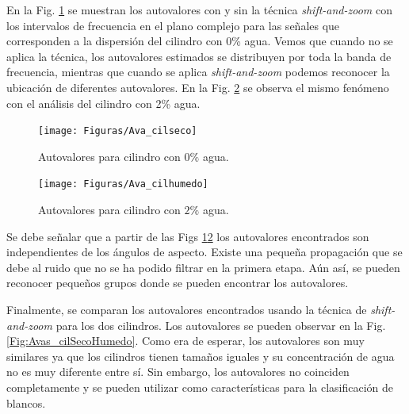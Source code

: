 	En la Fig. \ref{Fig:Avas_cilSeco} se muestran los autovalores con y sin la técnica  \emph{shift-and-zoom} con los intervalos de frecuencia en el plano complejo para las señales que corresponden a la dispersión del cilindro con 0\% agua. Vemos que cuando no se aplica la técnica, los autovalores estimados se distribuyen por toda la banda de frecuencia, mientras que cuando se aplica \emph{shift-and-zoom} podemos reconocer la ubicación de diferentes autovalores. En la Fig. \ref{Fig:Avas_cilHumedo} se observa  el mismo fenómeno con el análisis del cilindro con 2\% agua.
	
	\begin{figure}[ht]
		\centering
		\centerline{\texttt{[image: Figuras/Ava\_cilseco]}}
		\caption{Autovalores para cilindro con $0\%$ agua.}
		\label{Fig:Avas_cilSeco}
	\end{figure}
	
	\begin{figure}[ht]
		\centering
		\centerline{\texttt{[image: Figuras/Ava\_cilhumedo]}}
		\caption{Autovalores para cilindro con $2\%$ agua.}
		\label{Fig:Avas_cilHumedo}
	\end{figure}		
	
	
	Se debe señalar que  a partir de las Figs \ref{Fig:Avas_cilSeco}\ref{Fig:Avas_cilHumedo} los autovalores  encontrados son independientes de los ángulos de aspecto. Existe una pequeña propagación que se debe al ruido que no se ha podido filtrar en la primera etapa. Aún así, se pueden reconocer pequeños grupos donde se pueden encontrar los autovalores.
	
	Finalmente, se comparan los autovalores encontrados usando la técnica de \emph{shift-and-zoom}  para los dos cilindros. Los autovalores se pueden observar en la Fig.\ref{Fig:Avas_cilSecoHumedo}. Como era de esperar, los autovalores son muy similares ya que los cilindros tienen tamaños iguales y su concentración de agua no es muy diferente entre sí. Sin embargo, los autovalores no coinciden completamente y se pueden utilizar como características para la clasificación de blancos.
	
